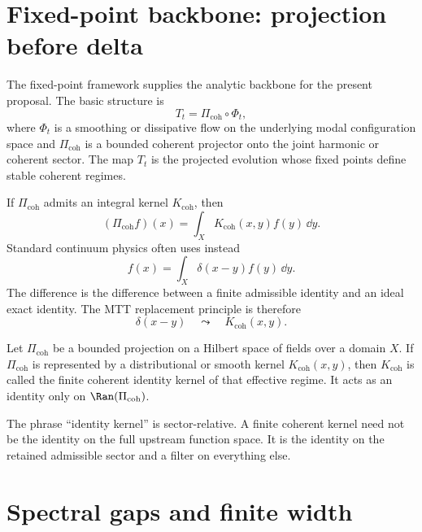 \documentclass[11pt]{article}
\begin{document}
\section{Fixed-point backbone: projection before delta}

The fixed-point framework supplies the analytic backbone for the present proposal.  The
basic structure is
\begin{equation}
T_t=\Pi_{\mathrm{coh}}\circ \Phi_t,
\end{equation}
where \(\Phi_t\) is a smoothing or dissipative flow on the underlying modal configuration
space and \(\Pi_{\mathrm{coh}}\) is a bounded coherent projector onto the joint harmonic or
coherent sector.  The map \(T_t\) is the projected evolution whose fixed points define
stable coherent regimes.

If \(\Pi_{\mathrm{coh}}\) admits an integral kernel \(K_{\mathrm{coh}}\), then
\begin{equation}
(\Pi_{\mathrm{coh}}f)(x)=\int_X K_{\mathrm{coh}}(x,y)f(y)\,\dd y.
\end{equation}
Standard continuum physics often uses instead
\begin{equation}
f(x)=\int_X \delta(x-y)f(y)\,\dd y.
\end{equation}
The difference is the difference between a finite admissible identity and an ideal exact
identity.  The MTT replacement principle is therefore
\begin{equation}
\boxed{\delta(x-y)\quad\leadsto\quad K_{\mathrm{coh}}(x,y).}
\end{equation}

\begin{definition}
Let \(\Pi_{\mathrm{coh}}\) be a bounded projection on a Hilbert space of fields over a
domain \(X\).  If \(\Pi_{\mathrm{coh}}\) is represented by a distributional or smooth kernel
\(K_{\mathrm{coh}}(x,y)\), then \(K_{\mathrm{coh}}\) is called the finite coherent identity
kernel of that effective regime. It acts as an identity only on \(\Ran(\Pi_{\mathrm{coh}})\).
\end{definition}

\begin{remark}
The phrase ``identity kernel'' is sector-relative.  A finite coherent kernel need not be
the identity on the full upstream function space.  It is the identity on the retained
admissible sector and a filter on everything else.
\end{remark}

\section{Spectral gaps and finite width}
\end{document}
